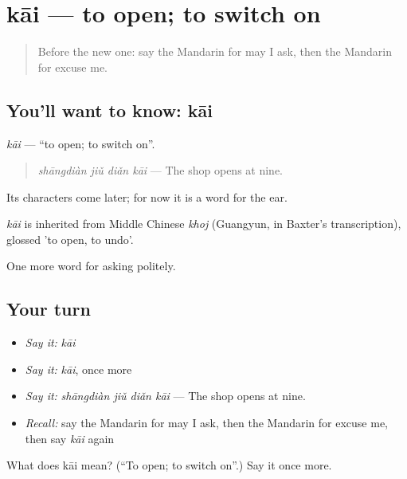 \section[kāi]{kāi — to open; to switch on}

\label{lesson:ZH-C65-kai}



\begin{quote}
Before the new one: say the Mandarin for may I ask, then the Mandarin for excuse me.
\end{quote}

\subsection*{You'll want to know: kāi}
\emph{kāi} — \textquotedblleft{}to open; to switch on\textquotedblright{}.

\begin{quote}
\emph{shāngdiàn jiǔ diǎn kāi} — The shop opens at nine.
\end{quote}

Its characters come later; for now it is a word for the ear.

\begin{cousinweb}
\emph{kāi} is inherited from Middle Chinese \emph{khoj} (Guangyun, in Baxter's transcription), glossed 'to open, to undo'.
\end{cousinweb}

\begin{grammarlens}[title={What you've built}]
One more word for asking politely.
\end{grammarlens}

\subsection*{Your turn}
\begin{itemize}
\raggedright
  \item \emph{Say it:} \emph{kāi}
  \item \emph{Say it:} \emph{kāi}, once more
  \item \emph{Say it:} \emph{shāngdiàn jiǔ diǎn kāi} — The shop opens at nine.
  \item \emph{Recall:} say the Mandarin for may I ask, then the Mandarin for excuse me, then say \emph{kāi} again
\end{itemize}

\begin{tcolorbox}[breakable,colback=teal!4,colframe=teal!35!black,title={Before you move on}]
What does kāi mean? (\textquotedblleft{}To open; to switch on\textquotedblright{}.) Say it once more.
\end{tcolorbox}
